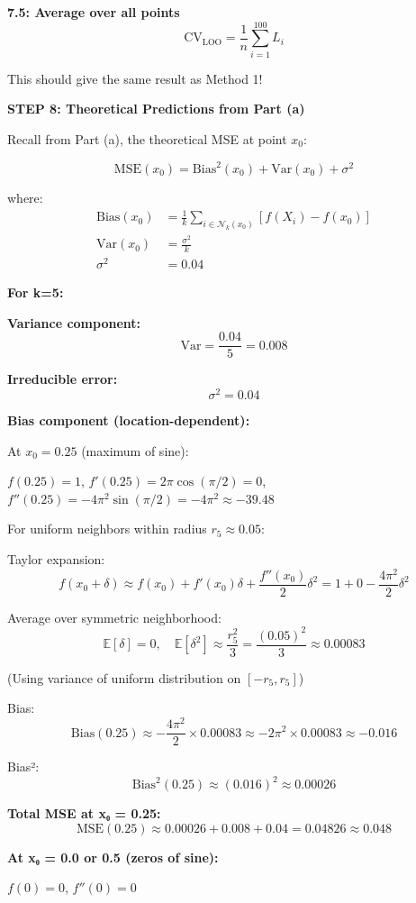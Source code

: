 \documentclass[12pt]{article}
\begin{document}
\begin{solution}
\textbf{7.5: Average over all points}
\[
\text{CV}_{\text{LOO}} = \frac{1}{n}\sum_{i=1}^{100} L_i
\]

This should give the same result as Method 1!

\textbf{STEP 8: Theoretical Predictions from Part (a)}

Recall from Part (a), the theoretical MSE at point $x_0$:

\[
\text{MSE}(x_0) = \text{Bias}^2(x_0) + \text{Var}(x_0) + \sigma^2
\]

where:
\begin{align*}
\text{Bias}(x_0) &= \frac{1}{k}\sum_{i \in \mathcal{N}_k(x_0)} [f(X_i) - f(x_0)] \\
\text{Var}(x_0) &= \frac{\sigma^2}{k} \\
\sigma^2 &= 0.04
\end{align*}

\textbf{For k=5:}

\textbf{Variance component:}
\[
\text{Var} = \frac{0.04}{5} = 0.008
\]

\textbf{Irreducible error:}
\[
\sigma^2 = 0.04
\]

\textbf{Bias component (location-dependent):}

At $x_0 = 0.25$ (maximum of sine):

$f(0.25) = 1$, $f'(0.25) = 2\pi\cos(\pi/2) = 0$, $f''(0.25) = -4\pi^2\sin(\pi/2) = -4\pi^2 \approx -39.48$

For uniform neighbors within radius $r_5 \approx 0.05$:

Taylor expansion:
\[
f(x_0 + \delta) \approx f(x_0) + f'(x_0)\delta + \frac{f''(x_0)}{2}\delta^2 = 1 + 0 - \frac{4\pi^2}{2}\delta^2
\]

Average over symmetric neighborhood:
\[
\mathbb{E}[\delta] = 0, \quad \mathbb{E}[\delta^2] \approx \frac{r_5^2}{3} = \frac{(0.05)^2}{3} \approx 0.00083
\]

(Using variance of uniform distribution on $[-r_5, r_5]$)

Bias:
\[
\text{Bias}(0.25) \approx -\frac{4\pi^2}{2} \times 0.00083 \approx -2\pi^2 \times 0.00083 \approx -0.016
\]

Bias²:
\[
\text{Bias}^2(0.25) \approx (0.016)^2 \approx 0.00026
\]

\textbf{Total MSE at x₀ = 0.25:}
\[
\text{MSE}(0.25) \approx 0.00026 + 0.008 + 0.04 = 0.04826 \approx 0.048
\]

\textbf{At x₀ = 0.0 or 0.5 (zeros of sine):}

$f(0) = 0$, $f''(0) = 0$


\end{solution}
\end{document}
